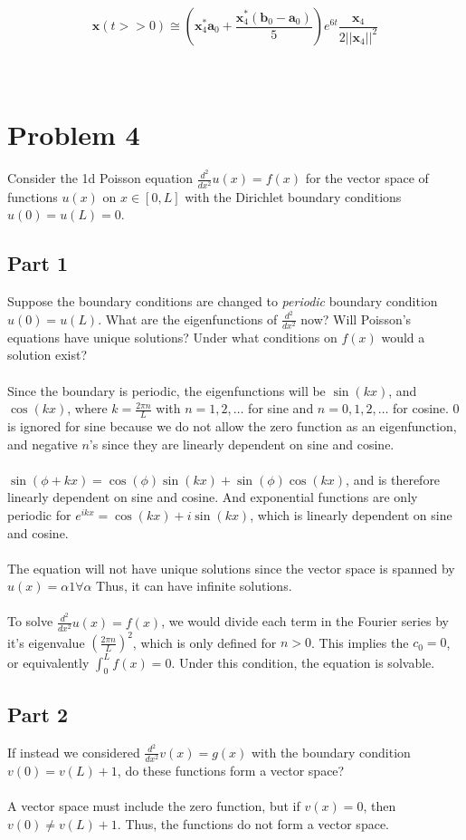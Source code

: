 \documentclass{amsart}
\begin{document}
	\[ \mathbf{x}(t>>0) \cong \left( \mathbf{x}_4^* \mathbf{a}_0 + \frac{\mathbf{x}_4^* (\mathbf{b}_0 - \mathbf{a}_0)}{5}\right) e^{6t} \frac{\mathbf{x}_4}{2||\mathbf{x}_4||^2} \]
	\\\\
	\section{Problem 4}
	Consider the 1d Poisson equation $\frac{d^2}{dx^2}u(x) = f(x)$ for the vector space of functions $u(x)$ on $x \in [0,L]$ with the Dirichlet boundary conditions $u(0) = u(L) = 0$.
	
	\subsection{Part 1}
	Suppose the boundary conditions are changed to \textit{periodic} boundary condition $u(0) = u(L)$. What are the eigenfunctions of $\frac{d^2}{dx^2}$ now? Will Poisson's equations have unique solutions? Under what conditions on $f(x)$ would a solution exist?
	\\\\
	Since the boundary is periodic, the eigenfunctions will be $\sin(kx)$, and $\cos(kx)$, where $k=\frac{2\pi n}{L}$ with $n = 1,2,\dots$ for sine and $n=0,1,2,\dots$ for cosine. 0 is ignored for sine because we do not allow the zero function as an eigenfunction, and negative $n$'s since they are linearly dependent on sine and cosine.
	\\\\
	\noindent
	$\sin(\phi + kx) = \cos(\phi)\sin(kx) + \sin(\phi)\cos(kx)$, and is therefore linearly dependent on sine and cosine. And exponential functions are only periodic for $e^{ikx} = \cos(kx)+i\sin(kx)$, which is linearly dependent on sine and cosine.
	\\\\
	\noindent
	The equation will not have unique solutions since the vector space is spanned by $u(x) = \alpha1 \forall \alpha$ Thus, it can have infinite solutions.
	\\\\
	\noindent
	To solve $\frac{d^2}{dx^2}u(x) = f(x)$, we would divide each term in the Fourier series by it's eigenvalue $(\frac{2\pi n}{L})^2$, which is only defined for $n>0$. This implies the $c_0 = 0$, or equivalently $\int_{0}^{L} f(x) = 0$. Under this condition, the equation is solvable.
	\subsection{Part 2}
	If instead we considered $\frac{d^2}{dx^2}v(x) = g(x)$ with the boundary condition $v(0) = v(L)+1$, do these functions form a vector space?
	\\\\
	A vector space must include the zero function, but if $v(x)=0$, then $v(0) \neq v(L)+1$. Thus, the functions do not form a vector space.
\end{document}

